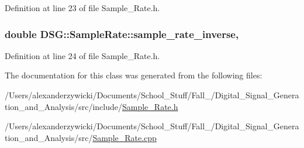 Definition at line 23 of file Sample\+\_\+\+Rate.\+h.

\hypertarget{classDSG_1_1SampleRate_a17f5dfa529560272a0c9c917e3e2a41f}{
\subsubsection[{sample\+\_\+rate\+\_\+inverse}]{\setlength{\rightskip}{0pt plus 5cm}double D\+S\+G\+::\+Sample\+Rate\+::sample\+\_\+rate\+\_\+inverse\hspace{0.3cm}{\ttfamily [static]}, {\ttfamily [protected]}}}\label{classDSG_1_1SampleRate_a17f5dfa529560272a0c9c917e3e2a41f}


Definition at line 24 of file Sample\+\_\+\+Rate.\+h.



The documentation for this class was generated from the following files\+:\begin{DoxyCompactItemize}
\item 
/\+Users/alexanderzywicki/\+Documents/\+School\+\_\+\+Stuff/\+Fall\+\_/\+Digital\+\_\+\+Signal\+\_\+\+Generation\+\_\+and\+\_\+\+Analysis/src/include/\hyperlink{Sample__Rate_8h}{Sample\+\_\+\+Rate.\+h}\item 
/\+Users/alexanderzywicki/\+Documents/\+School\+\_\+\+Stuff/\+Fall\+\_/\+Digital\+\_\+\+Signal\+\_\+\+Generation\+\_\+and\+\_\+\+Analysis/src/\hyperlink{Sample__Rate_8cpp}{Sample\+\_\+\+Rate.\+cpp}\end{DoxyCompactItemize}

